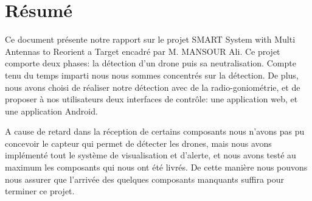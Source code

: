 
\chapter*{Résumé}




Ce document présente notre rapport sur le projet SMART \og System with Multi Antennas to Reorient a Target\fg{} encadré  par M. MANSOUR Ali. Ce projet comporte deux phases: la détection d'un drone puis sa neutralisation. Compte tenu du  temps imparti nous nous sommes concentrés sur la détection. De plus, nous avons choisi de réaliser notre détection avec de la radio-goniométrie, et de proposer à nos utilisateurs deux interfaces de contrôle: une application web, et une application Android.


A cause de retard dans la réception de certains composants nous n'avons pas pu concevoir le capteur qui permet de détecter les drones, mais nous avons implémenté tout le système de visualisation et d'alerte, et nous avons testé au maximum les composants qui nous ont été livrés. De cette manière nous pouvons nous assurer que l'arrivée des quelques composants manquants suffira pour terminer ce projet. ~\\






